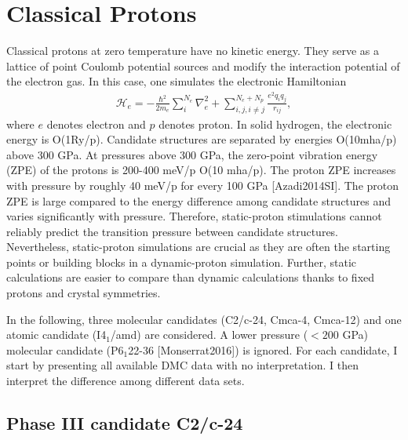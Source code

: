 \section{Classical Protons}

Classical protons at zero temperature have no kinetic energy. They serve as a lattice of point Coulomb potential sources and modify the interaction potential of the electron gas. In this case, one simulates the electronic Hamiltonian
\begin{align}
\mathcal{H}_e = -\frac{\hbar^2}{2 m_e}\sum\limits_i^{N_e} \nabla_e^2 + \sum\limits_{i,j,i\neq j}^{N_e+N_p} \frac{e^2q_iq_j}{r_{ij}},
\end{align}
where $e$ denotes electron and $p$ denotes proton. In solid hydrogen, the electronic energy is O(1Ry/p). Candidate structures are separated by energies O(10mha/p) above 300 GPa. At pressures above 300 GPa, the zero-point vibration energy (ZPE) of the protons is 200-400 meV/p O(10 mha/p). The proton ZPE increases with pressure by roughly 40 meV/p for every 100 GPa [Azadi2014SI]. The proton ZPE is large compared to the energy difference among candidate structures and varies significantly with pressure. Therefore, static-proton stimulations cannot reliably predict the transition pressure between candidate structures. Nevertheless, static-proton simulations are crucial as they are often the starting points or building blocks in a dynamic-proton simulation. Further, static calculations are easier to compare than dynamic calculations thanks to fixed protons and crystal symmetries.

In the following, three molecular candidates (C2/c-24, Cmca-4, Cmca-12) and one atomic candidate (I4$_1$/amd) are considered. A lower pressure ($<200$ GPa) molecular candidate (P6$_1$22-36 [Monserrat2016]) is ignored. For each candidate, I start by presenting all available DMC data with no interpretation. I then interpret the difference among different data sets.

\subsection{Phase III candidate C2/c-24}

